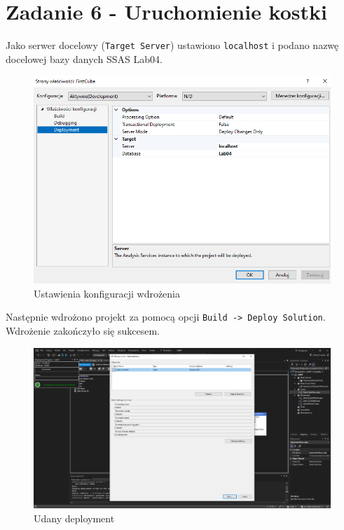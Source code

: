 \documentclass[a4paper,12pt]{article}
\begin{document}
\section{Zadanie 6 - Uruchomienie kostki}

Jako serwer docelowy (\texttt{Target Server}) ustawiono \texttt{localhost} i podano nazwę docelowej bazy danych SSAS Lab04.

\begin{figure}[H]
    \centering
    \includegraphics[width=1.0\textwidth]{images/6_deployment_properties.png}
    \caption{Ustawienia konfiguracji wdrożenia}
\end{figure}

Następnie wdrożono projekt za pomocą opcji \texttt{Build -> Deploy Solution}. Wdrożenie zakończyło się sukcesem.

\begin{figure}[H]
    \centering
    \includegraphics[width=1.0\textwidth]{images/6_deployment_success.png}
    \caption{Udany deployment}
\end{figure}
\end{document}
